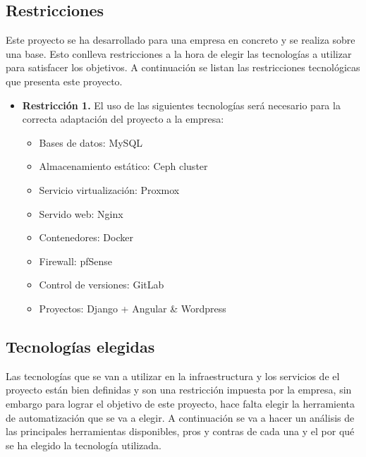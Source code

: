         \subsection{Restricciones}
        \begin{text}
                Este proyecto se ha desarrollado para una empresa en concreto y se realiza sobre una base. Esto conlleva restricciones a la hora de elegir las tecnologías a utilizar para satisfacer los objetivos. A continuación se listan las restricciones tecnológicas que presenta este proyecto.

                \begin{itemize}
                        \item \textbf{Restricción 1.} El uso de las siguientes tecnologías será necesario para la correcta adaptación del proyecto a la empresa:
                        \begin{itemize}
                                \item Bases de datos: MySQL
                                \item Almacenamiento estático: Ceph cluster
                                \item Servicio virtualización: Proxmox
                                \item Servido web: Nginx
                                \item Contenedores: Docker
                                \item Firewall: pfSense
                                \item Control de versiones: GitLab
                                \item Proyectos: Django + Angular \& Wordpress
                        \end{itemize}
                \end{itemize}
        \end{text}

        \subsection{Tecnologías elegidas}
        \begin{text}
                Las tecnologías que se van a utilizar en la infraestructura y los servicios de el proyecto están bien definidas y son una restricción impuesta por la empresa, sin embargo para lograr el objetivo de este proyecto, hace falta elegir la herramienta de automatización que se va a elegir. A continuación se va a hacer un análisis de las principales herramientas disponibles, pros y contras de cada una y el por qué se ha elegido la tecnología utilizada.
        \end{text}

